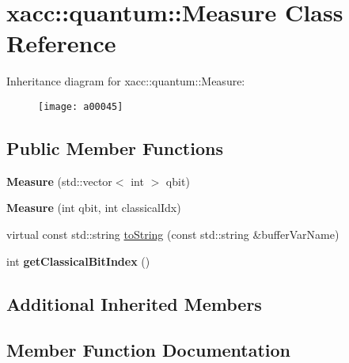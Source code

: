 \hypertarget{a00045}{}\section{xacc\+:\+:quantum\+:\+:Measure Class Reference}
\label{a00045}
Inheritance diagram for xacc\+:\+:quantum\+:\+:Measure\+:\begin{figure}[H]
\begin{center}
\leavevmode
\texttt{[image: a00045]}
\end{center}
\end{figure}
\subsection*{Public Member Functions}
\begin{DoxyCompactItemize}
\item 
{\bfseries Measure} (std\+::vector$<$ int $>$ qbit)\hypertarget{a00045_afe330a0eea029d842ff9c88a817dcc7d}{}\label{a00045_afe330a0eea029d842ff9c88a817dcc7d}

\item 
{\bfseries Measure} (int qbit, int classical\+Idx)\hypertarget{a00045_a9b8d9edca8ad2c3fb132780200f17335}{}\label{a00045_a9b8d9edca8ad2c3fb132780200f17335}

\item 
virtual const std\+::string \hyperlink{a00045_a1c51a5d68294dcb2ba1a9fbea63a730f}{to\+String} (const std\+::string \&buffer\+Var\+Name)
\item 
int {\bfseries get\+Classical\+Bit\+Index} ()\hypertarget{a00045_a0cb3c94731544042807236ade36fddd0}{}\label{a00045_a0cb3c94731544042807236ade36fddd0}

\end{DoxyCompactItemize}
\subsection*{Additional Inherited Members}


\subsection{Member Function Documentation}

